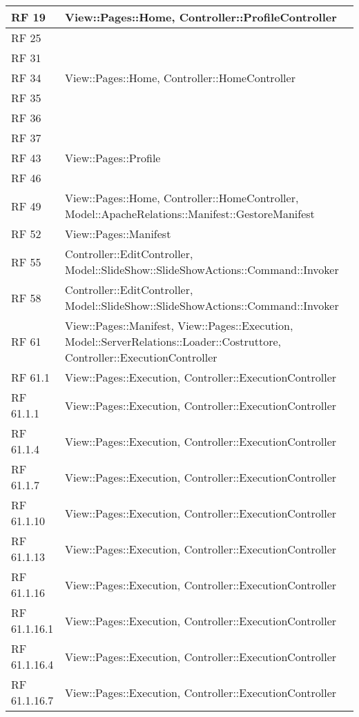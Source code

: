 {\begin{longtable} [c]{| p{2cm} | p{14cm} |}
 \hline 
RF 19 & View::Pages::\-Home, Controller::\-ProfileController\\ 
 \hline 
RF 25 & \\ 
 \hline 
RF 31 & \\ 
 \hline 
RF 34 & View::Pages::\-Home, Controller::\-HomeController\\ 
 \hline 
RF 35 & \\ 
 \hline 
RF 36 & \\ 
 \hline 
RF 37 & \\ 
 \hline 
RF 43 & View::Pages::\-Profile\\ 
 \hline 
RF 46 & \\ 
 \hline 
RF 49 & View::Pages::\-Home, Controller::\-HomeController, Model::ApacheRelations::Manifest::\-GestoreManifest\\ 
 \hline 
RF 52 & View::Pages::\-Manifest\\ 
 \hline 
RF 55 & Controller::\-EditController, Model::SlideShow::SlideShowActions::Command::\-Invoker\\ 
 \hline 
RF 58 & Controller::\-EditController, Model::SlideShow::SlideShowActions::Command::\-Invoker\\ 
 \hline 
RF 61 & View::Pages::\-Manifest, View::Pages::\-Execution, Model::ServerRelations::Loader::\-Costruttore, Controller::\-ExecutionController\\ 
 \hline 
RF 61.1 & View::Pages::\-Execution, Controller::\-ExecutionController\\ 
 \hline 
RF 61.1.1 & View::Pages::\-Execution, Controller::\-ExecutionController\\ 
 \hline 
RF 61.1.4 & View::Pages::\-Execution, Controller::\-ExecutionController\\ 
 \hline 
RF 61.1.7 & View::Pages::\-Execution, Controller::\-ExecutionController\\ 
 \hline 
RF 61.1.10 & View::Pages::\-Execution, Controller::\-ExecutionController\\ 
 \hline 
RF 61.1.13 & View::Pages::\-Execution, Controller::\-ExecutionController\\ 
 \hline 
RF 61.1.16 & View::Pages::\-Execution, Controller::\-ExecutionController\\ 
 \hline 
RF 61.1.16.1 & View::Pages::\-Execution, Controller::\-ExecutionController\\ 
 \hline 
RF 61.1.16.4 & View::Pages::\-Execution, Controller::\-ExecutionController\\ 
 \hline 
RF 61.1.16.7 & View::Pages::\-Execution, Controller::\-ExecutionController\\ 

\end{longtable}}
